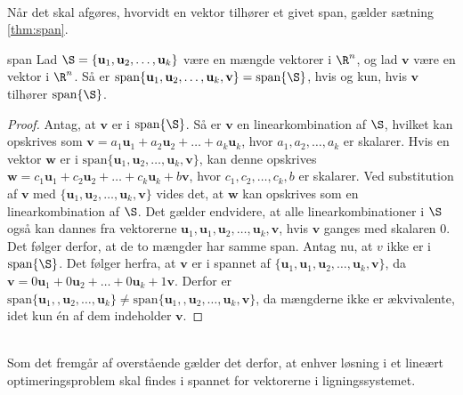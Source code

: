 \\
%
%
Når det skal afgøres, hvorvidt en vektor tilhører et givet span, gælder sætning \ref{thm:span}.
%
\begin{thm}{}{span}
%
Lad $\S =  \{ \mathbf{u}_1, \mathbf{u}_2 , \ldots , \mathbf{u}_k \}$ være en mængde vektorer i $\R^n$, og lad $\mathbf{v}$ være en vektor i $\R^n$.
Så er $\text{span}\{ \mathbf{u}_1, \mathbf{u}_2 , \ldots , \mathbf{u}_k , \mathbf{v}\} =\text{span}\{\S\}$, hvis og kun, hvis $\mathbf{v}$ tilhører $\text{span}\{\S\}$.
%
\end{thm}
%
%
\begin{proof}
%
Antag, at $\mathbf{v}$ er i $\text{span}\{\S\}$. Så er $\mathbf{v}$ en linearkombination af $\S$, hvilket kan opskrives som $\mathbf{v}=a_1\mathbf{u}_1+a_2\mathbf{u}_2+ \ldots + a_k\mathbf{u}_k$, hvor $a_1,a_2,\ldots, a_k$ er skalarer. 
Hvis en vektor $\mathbf{w}$ er i $\text{span}\{ \mathbf{u}_1, \mathbf{u}_2 , \ldots , \mathbf{u}_k , \mathbf{v}\}$, 
kan denne opskrives $\mathbf{w}=c_1\mathbf{u}_1+c_2\mathbf{u}_2+ \ldots + c_k\mathbf{u}_k+b\mathbf{v}$, hvor $c_1,c_2,\ldots, c_k, b$ er skalarer.
Ved substitution af $\mathbf{v}$ med $\{ \mathbf{u}_1, \mathbf{u}_2 , \ldots , \mathbf{u}_k , \mathbf{v}\}$ vides det, at $\mathbf{w}$ kan opskrives som en linearkombination af $\S$. 
Det gælder endvidere, at alle linearkombinationer i $\S$ også kan dannes fra vektorerne $\mathbf{u}_1,\mathbf{u}_1, \mathbf{u}_2 , \ldots , \mathbf{u}_k , \mathbf{v}$, hvis $\mathbf{v}$ ganges med skalaren $0$.
Det følger derfor, at de to mængder har samme span. 
Antag nu, at $v$ ikke er i $\text{span}\{\S\}$. 
Det følger herfra, at $\mathbf{v}$ er i spannet af 
$\{ \mathbf{u}_1,\mathbf{u}_1, \mathbf{u}_2 , \ldots , \mathbf{u}_k , \mathbf{v}\}$, da 
$\mathbf{v}=0\mathbf{u}_1+0\mathbf{u}_2+ \ldots + 0\mathbf{u}_k+1\mathbf{v}$.
Derfor er
$\text{span}\{ \mathbf{u}_1,, \mathbf{u}_2 , \ldots , \mathbf{u}_k \}
\neq
\text{span}\{ \mathbf{u}_1,, \mathbf{u}_2 , \ldots , \mathbf{u}_k , \mathbf{v}\}$, 
da mængderne ikke er ækvivalente, idet kun én af dem indeholder $\mathbf{v}$. 
%
\end{proof}
\\
%
%
Som det fremgår af overstående gælder det derfor, at enhver løsning i et lineært optimeringsproblem skal findes i spannet for vektorerne i ligningssystemet. 
%